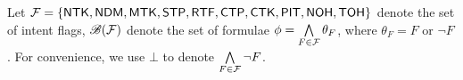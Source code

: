 
Let $\mathcal{F}=\{{\sf NTK},{\sf NDM},{\sf MTK}, {\sf STP},{\sf RTF},{\sf CTP}, {\sf CTK},{\sf PIT},{\sf NOH},{\sf TOH}\}$ denote the set of intent flags, $\mathscr{B}(\mathcal{F})$ denote the set of formulae $\phi = \bigwedge \limits_{F \in \mathcal{F}} \theta_F$, where $\theta_F = F$ or $\neg F$. For convenience, we use $\bot$ to denote $ \bigwedge \limits_{F \in \mathcal{F}} \neg F$. 


